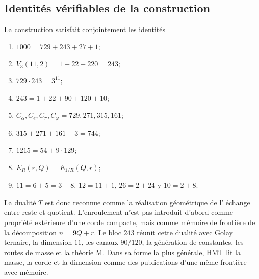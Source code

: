 \subsection{Identités vérifiables de la construction}

La construction satisfait conjointement les identités
\begin{enumerate}
\item \(1000=729+243+27+1\);
\item \(V_3(11,2)=1+22+220=243\);
\item \(729\cdot243=3^{11}\);
\item \(243=1+22+90+120+10\);
\item \(C_\alpha,C_e,C_\pi,C_\varphi=729,271,315,161\);
\item \(315+271+161-3=744\);
\item \(1215=54+9\cdot129\);
\item \(E_R(r,Q)=E_{1/R}(Q,r)\);
\item \(11=6+5=3+8\), \(12=11+1\), \(26=2+24\) y \(10=2+8\).
\end{enumerate}

La dualité \(T\) est donc reconnue comme la réalisation géométrique de l'
échange entre reste et quotient. L'enroulement n'est pas introduit
d'abord comme propriété extérieure d'une corde compacte, mais comme mémoire de
frontière de la décomposition \(n=9Q+r\). Le bloc \(243\) réunit cette
dualité avec Golay ternaire, la dimension \(11\), les canaux \(90/120\), la génération
de constantes, les routes de masse et la théorie M. Dans sa forme la plus générale, HMT lit la
masse, la corde et la dimension comme des publications d'une même frontière avec
mémoire.
